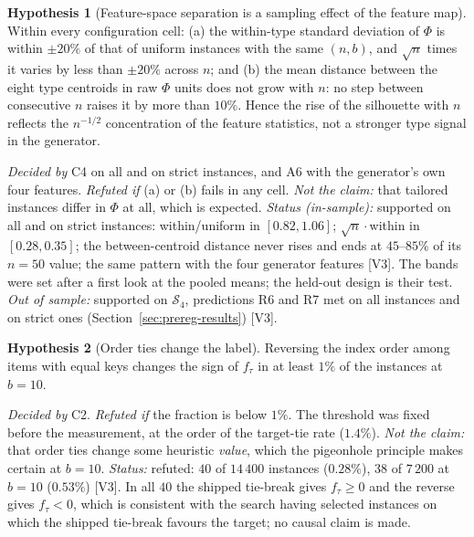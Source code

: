 \documentclass[a4paper,11pt]{article}
\newcommand{\evid}[1]{\textcolor{inkSoft}{\scriptsize[#1]}}
\theoremstyle{plain}
\theoremstyle{definition}
\newtheorem{hypothesis}{Hypothesis}
\theoremstyle{remark}
\begin{document}
\begin{hypothesis}[Feature-space separation is a sampling effect of the feature map]\label{h:pca}
Within every configuration cell:
(a) the within-type standard deviation of $\Phi$ is within $\pm20\%$ of that of uniform
instances with the same $(n,b)$, and $\sqrt n$ times it varies by less than $\pm20\%$ across
$n$; and
(b) the mean distance between the eight type centroids in raw $\Phi$ units does not grow
with $n$: no step between consecutive $n$ raises it by more than $10\%$.
Hence the rise of the silhouette with $n$ reflects the $n^{-1/2}$ concentration of the
feature statistics, not a stronger type signal in the generator.
\par\emph{Decided by} C4 on all and on strict instances, and A6 with the generator's own four
features. \emph{Refuted if} (a) or (b) fails in any cell.
\emph{Not the claim:} that tailored instances differ in $\Phi$ at all, which is expected.
\emph{Status (in-sample):} supported on all and on strict instances: within/uniform in
$[0.82,1.06]$; $\sqrt n\cdot$within in $[0.28,0.35]$; the between-centroid distance never
rises and ends at $45$--$85\%$ of its $n=50$ value; the same pattern with the four generator
features \evid{V3}. The bands were set after a first look at the pooled means; the held-out
design is their test.
\emph{Out of sample:} supported on $\mathcal S_4$, predictions R6 and R7 met on all instances
and on strict ones (Section~\ref{sec:prereg-results}) \evid{V3}.
\end{hypothesis}

\begin{hypothesis}[Order ties change the label]\label{h:sign}
Reversing the index order among items with equal keys changes the sign of $f_\tau$ in at
least $1\%$ of the instances at $b=10$.
\par\emph{Decided by} C2. \emph{Refuted if} the fraction is below $1\%$. The threshold was
fixed before the measurement, at the order of the target-tie rate ($1.4\%$).
\emph{Not the claim:} that order ties change some heuristic \emph{value}, which the
pigeonhole principle makes certain at $b=10$.
\emph{Status:} refuted: $40$ of $14\,400$ instances ($0.28\%$), $38$ of $7\,200$ at $b=10$
($0.53\%$) \evid{V3}. In all $40$ the shipped tie-break gives $f_\tau\ge0$ and the reverse
gives $f_\tau<0$, which is consistent with the search having selected instances on which the
shipped tie-break favours the target; no causal claim is made.
\end{hypothesis}
\end{document}
